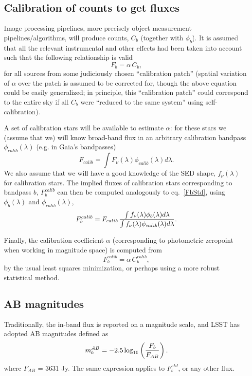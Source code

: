 \documentclass{emulateapj}
\begin{document}
\subsection{Calibration of counts to get fluxes} 

Image processing pipelines, more precisely object measurement pipelines/algorithms,
will produce counts, $C_b$ (together with $\phi_b$). It is assumed that all the relevant 
instrumental and other effects had been taken into account such that the following 
relationship is valid
\begin{equation} 
               F_b = \alpha \,  C_b,
\end{equation} 
for all sources from some judiciously chosen ``calibration patch'' (spatial variation of $\alpha$ over
the patch is assumed to be corrected for, though the above equation could be easily
generalized; in principle, this  ``calibration patch'' could correspond to the entire 
sky if all $C_b$ were ``reduced to the same system'' using self-calibration). 

A set of calibration stars will be available to estimate $\alpha$: for these stars 
we (assume that we) will know broad-band flux in an arbitrary calibration bandpass
$\phi_{calib}(\lambda)$ (e.g. in Gaia's bandpasses)
\begin{equation}
\label{FbCalib}
             F_{calib} = \int{F_\nu(\lambda) \phi_{calib}(\lambda) d\lambda}.
\end{equation}
We also assume that we will have a good knowledge of the SED shape,
$f_\nu(\lambda)$ for calibration stars. The implied fluxes of calibration stars corresponding 
to bandpass $b$, $F_b^{calib}$ can then be computed analogously to eq.~\ref{FbStd}, using 
$\phi_b(\lambda)$ and $\phi_{calib}(\lambda)$,
\begin{equation}
\label{FbStdCalib}
F^{calib}_b =  F_{calib} \, {\int{f_\nu(\lambda)  \phi_b(\lambda) d\lambda }  \over   \int{ f_\nu(\lambda) \phi_{calib}(\lambda) d\lambda }}. 
\end{equation}


Finally, the calibration coefficient $\alpha$ (corresponding to photometric zeropoint when
working in magnitude space) is computed from
\begin{equation} 
                 F_b^{calib} = \alpha \,  C_b^{calib},
\end{equation} 
by the usual least squares minimization, or perhaps using a more robust statistical method. 


\subsection{AB magnitudes} 
Traditionally, the in-band flux is reported on a magnitude scale, and LSST has adopted
AB magnitudes defined as 
\begin{equation}
\label{ABmag}
              m^{AB}_b = -2.5\log_{10}\left({F_b \over F_{AB}}\right).
\end{equation}
where $F_{AB}$ = 3631 Jy. 
The same expression applies to $F^{std}_b$, or any other flux. 
\end{document}

